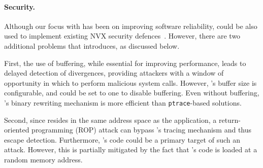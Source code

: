\paragraph{Security.} Although our focus with \varan has been on
improving software reliability, \varan could be also used to implement
existing NVX security defences~\cite{cox2006,orchestra09}.  However,
there are two additional problems that \varan introduces, as discussed
below.

First, the use of buffering, while essential for improving
performance, leads to delayed detection of divergences, providing
attackers with a window of opportunity in which to perform malicious
system calls.  However, \varan's buffer size is configurable, and
could be set to one to disable buffering. Even without buffering,
\varan's binary rewriting mechanism is more efficient than
\lstinline`ptrace`-based solutions.

Second, since \varan resides in the same address space as the
application, a return-oriented programming (ROP) attack can bypass
\varan's tracing mechanism and thus escape detection.  Furthermore,
\varan's code could be a primary target of such an attack. However,
this is partially mitigated by the fact that \varan's code is loaded
at a random memory address.
